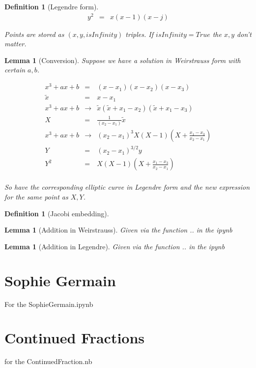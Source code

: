 \documentclass[11pt]{article}
\theoremstyle{change}
\newtheorem{definition}[equation]{Definition}
\newtheorem{lemma}[equation]{Lemma}
\theoremstyle{nonumberplain}
\numberwithin{equation}{section}
\begin{document}
\begin{definition}[Legendre form]
\begin{eqnarray*}
y^2 &=& x (x-1) (x - j)
\end{eqnarray*}

Points are stored as $(x,y,isInfinity)$ triples. If $isInfinity=True$ the $x,y$ don't matter.
\end{definition}

\begin{lemma}[Conversion]
Suppose we have a solution in Weirstrauss form with certain $a,b$.

\begin{eqnarray*}
x^3 + a x + b &=& (x - x_1) (x - x_2) (x - x_3)\\
\tilde{x} &=& x - x_1\\
x^3 + a x + b &\to& \tilde{x} ( \tilde{x} + x_1 - x_2) (\tilde{x} + x_1 - x_3)\\
X &=& \frac{1}{(x_2 - x_1)}  \tilde{x}\\
x^3 + a x + b &\to& (x_2 - x_1)^{3} X ( X - 1) (X + \frac{x_1 - x_3}{x_2 - x_1})\\
Y &=& (x_2 - x_1)^{3/2} y\\
Y^2 &=& X ( X - 1) (X + \frac{x_1 - x_3}{x_2 - x_1})\\
\end{eqnarray*}

So have the corresponding elliptic curve in Legendre form and the new expression for the same point as $X,Y$.

\end{lemma}

\begin{definition}[Jacobi embedding]
\end{definition}

\begin{lemma}[Addition in Weirstrauss]
Given via the function .. in the ipynb
\end{lemma}

\begin{lemma}[Addition in Legendre]
Given via the function .. in the ipynb
\end{lemma}

\section{Sophie Germain}

For the SophieGermain.ipynb

\section{Continued Fractions}

for the ContinuedFraction.nb
\end{document}
